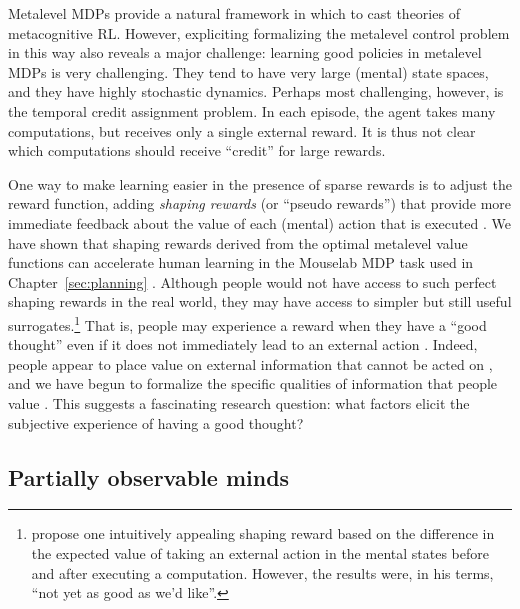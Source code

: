 Metalevel MDPs provide a natural framework in which to cast theories of metacognitive RL. However, expliciting formalizing the metalevel control problem in this way also reveals a major challenge: learning good policies in metalevel MDPs is very challenging. They tend to have very large (mental) state spaces, and they have highly stochastic dynamics. Perhaps most challenging, however, is the temporal credit assignment problem. In each episode, the agent takes many computations, but receives only a single external reward. It is thus not clear which computations should receive ``credit'' for large rewards. 

One way to make learning easier in the presence of sparse rewards is to adjust the reward function, adding \emph{shaping rewards} (or ``pseudo rewards'') that provide more immediate feedback about the value of each (mental) action that is executed \citep{ng1999policy}. We have shown that shaping rewards derived from the optimal metalevel value functions can accelerate human learning in the Mouselab MDP task used in Chapter~\ref{sec:planning} \citep{callaway2022leveraging}. Although people would not have access to such perfect shaping rewards in the real world, they may have access to simpler but still useful surrogates.\footnote{%
  \citet{hay2016principles} propose one intuitively appealing shaping reward based on the difference in the expected value of taking an external action in the mental states before and after executing a computation. However, the results were, in his terms, ``not yet as good as we’d like''.
} That is, people may experience a reward when they have a ``good thought'' even if it does not immediately lead to an external action \citep{gopnik1998explanation}. Indeed, people appear to place value on external information that cannot be acted on \citep{eliaz2007experimental,gottlieb2018neuroscience}, and we have begun to formalize the specific qualities of information that people value \citep{markant2014preference,markant2016selfdirected}. This suggests a fascinating research question: what factors elicit the subjective experience of having a good thought?


\subsection{Partially observable minds}


